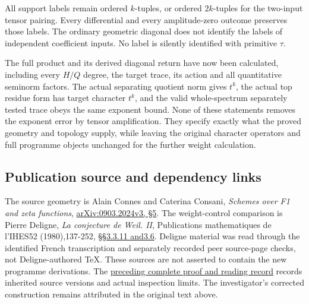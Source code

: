 All support labels remain ordered \(k\)-tuples, or ordered \(2k\)-tuples
for the two-input tensor pairing. Every differential and every
amplitude-zero outcome preserves those labels. The ordinary geometric
diagonal does not identify the labels of independent coefficient inputs.
No label is silently identified with primitive \(\tau\).

The full product and its derived diagonal return have now been
calculated, including every \(H/Q\) degree, the target trace, its action
and all quantitative seminorm factors. The actual separating quotient
norm gives \(t^k\), the actual top residue form has target character
\(t^k\), and the valid whole-spectrum separately tested trace obeys the
same exponent bound. None of these statements removes the exponent error
by tensor amplification. They specify exactly what the proved geometry
and topology supply, while leaving the original character operators and
full programme objects unchanged for the further weight calculation.

\subsection{Publication source and dependency
links}\label{publication-source-and-dependency-links}

The source geometry is Alain Connes and Caterina Consani, \emph{Schemes
over F1 and zeta functions},
\href{https://arxiv.org/abs/0903.2024v3}{arXiv:0903.2024v3, §5}. The
weight-control comparison is Pierre Deligne, \emph{La conjecture de
Weil. II}, Publications mathematiques de l'IHES52 (1980),137-252,
\href{https://www.numdam.org/item/PMIHES_1980__52__137_0/}{§§3.3.11
and3.6}. Deligne material was read through the identified French
transcription and separately recorded peer source-page checks, not
Deligne-authored TeX. These sources are not asserted to contain the new
programme derivations. The
\href{https://github.com/KokunoYumeto/zeta-function-research-reader/blob/36a82ecca98addb8a98b48204e349737856c7223/workbenches/splitzero-tandem/continuations/20260924-cohomology-weight-and-character-lifts/BUILD_AND_REVIEW.md}{preceding
complete proof and reading record} records inherited source versions and
actual inspection limits. The investigator's corrected construction
remains attributed in the original text above.
